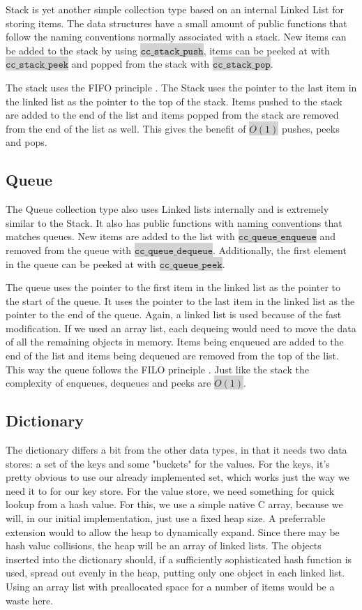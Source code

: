 \documentclass[table]{ituthesis}
\newcommand{\highlight}[1]{\colorbox{lightGray}{$\displaystyle \texttt{#1}$}}
\begin{document}
	Stack is yet another simple collection type based on an internal Linked List for storing items. The data structures have a small amount of public functions that follow the naming conventions normally associated with a stack. New items can be added to the stack by using \highlight{cc\_stack\_push}, items can be peeked at with \highlight{cc\_stack\_peek} and popped from the stack with \highlight{cc\_stack\_pop}.

	The stack uses the FIFO principle \cite[p. 200]{Algorithms2002}. The Stack uses the pointer to the last item in the linked list as the pointer to the top of the stack. Items pushed to the stack are added to the end of the list and items popped from the stack are removed from the end of the list as well. This gives the benefit of \highlight{$O(1)$} pushes, peeks and pops.
	
	\subsection{Queue}
	
	The Queue collection type also uses Linked lists internally and is extremely similar to the Stack. It also has public functions with naming conventions that matches queues. New items are added to the list with \highlight{cc\_queue\_enqueue} and removed from the queue with \highlight{cc\_queue\_dequeue}. Additionally, the first element in the queue can be peeked at with \highlight{cc\_queue\_peek}.

	The queue uses the pointer to the first item in the linked list as the pointer to the start of the queue. It uses the pointer to the last item in the linked list as the pointer to the end of the queue. Again, a linked list is used because of the fast modification. If we used an array list, each dequeing would need to move the data of all the remaining objects in memory. Items being enqueued are added to the end of the list and items being dequeued are removed from the top of the list. This way the queue follows the FILO principle \cite[p. 200]{Algorithms2002}. Just like the stack the complexity of enqueues, dequeues and peeks are \highlight{$O(1)$}.
	
	\subsection{Dictionary}
	
	The dictionary differs a bit from the other data types, in that it needs two data stores: a set of the keys and some "buckets" for the values. For the keys, it's pretty obvious to use our already implemented set, which works just the way we need it to for our key store. For the value store, we need something for quick lookup from a hash value. For this, we use a simple native C array, because we will, in our initial implementation, just use a fixed heap size. A preferrable extension would to allow the heap to dynamically expand. Since there may be hash value collisions, the heap will be an array of linked lists. The objects inserted into the dictionary should, if a sufficiently sophisticated hash function is used, spread out evenly in the heap, putting only one object in each linked list. Using an array list with preallocated space for a number of items would be a waste here.
\end{document}
